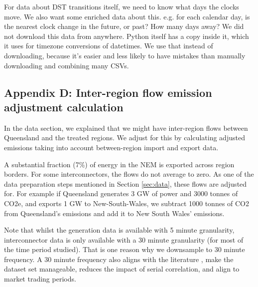 For data about \ac{DST} transitions itself, we need to know what days the clocks move. We also want some enriched data about this. e.g. for each calendar day, is the nearest clock change in the future, or past? How many days away? We did not download this data from anywhere. Python itself has a copy inside it, which it uses for timezone conversions of datetimes. We use that instead of downloading, because it's easier and less likely to have mistakes than manually downloading and combining many CSVs.

\subsection*{Appendix D: Inter-region flow emission adjustment calculation}
\label{sec:interconnector calc}
In the data section, we explained that we might have inter-region flows between Queensland and the treated regions. We adjust for this by calculating adjusted emissions taking into account between-region import and export data. 

A substantial fraction (7\%) of energy in the \ac{NEM} is exported across region borders. For some interconnectors, the flows do not average to zero. As one of the data preparation steps mentioned in Section \ref{sec:data}, these flows are adjusted for. For example if Queensland generates 3 GW of power and 3000 tonnes of CO2e, and exports 1 GW to New-South-Wales, we subtract 1000 tonnes of CO2 from Queensland's emissions and add it to New South Wales' emissions. 

Note that whilst the generation data is available with 5 minute granularity, interconnector data is only available with a 30 minute granularity (for most of the time period studied). That is one reason why we downsample to 30 minute frequency.
A 30 minute frequency also aligns with the literature \parencite{kellogg_daylight_2008}, make the dataset set manageable, reduces the impact of serial correlation, and align to market trading periods.